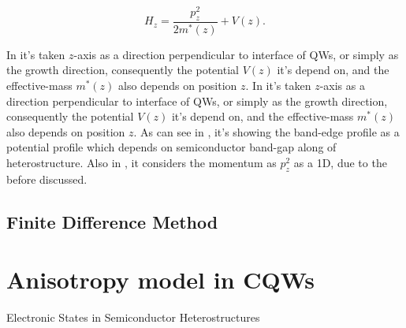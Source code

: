 \begin{equation}\label{eqn:chapter2-sec-numerical-calculations-ema-hamiltonian}
	H_{z} = \dfrac{p_{z}^{2}}{2m^{*}(z)}+V(z).
\end{equation}


In  it's taken $z$-axis as a direction perpendicular to interface of QWs, or simply as the growth direction, consequently the potential $V(z)$ it's depend on, and the effective-mass $m^{*}(z)$ also depends on position $z$. In  it's taken $z$-axis as a direction perpendicular to interface of QWs, or simply as the growth direction, consequently the potential $V(z)$ it's depend on, and the effective-mass $m^{*}(z)$ also depends on position $z$. As can see in , it's showing the band-edge profile as a potential profile which depends on semiconductor band-gap along of heterostructure.  Also in , it considers the momentum as $p_{z}^{2}$ as a 1D, due to the before discussed. 


\subsection{Finite Difference Method}
\section{Anisotropy model in CQWs \label{sub:chap2-anisotropy-model}}

Electronic States in Semiconductor Heterostructures 


